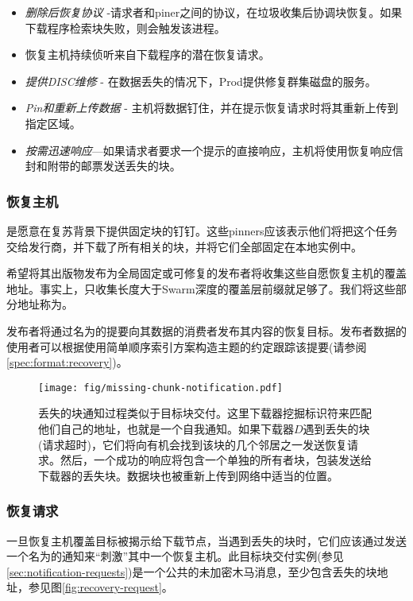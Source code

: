 \begin{itemize}
\item \emph{删除后恢复协议} -请求者和piner之间的协议，在垃圾收集后协调块恢复。如果下载程序检索块失败，则会触发该进程。
\item 恢复主机持续侦听来自下载程序的潜在恢复请求。
\item \emph{提供DISC维修} -
在数据丢失的情况下，Prod提供修复群集磁盘的服务。
\item \emph{Pin和重新上传数据} -
主机将数据钉住，并在提示恢复请求时将其重新上传到指定区域。 
\item \emph{按需迅速响应}—如果请求者要求一个提示的直接响应，主机将使用恢复响应信封和附带的邮票发送丢失的块。
\end{itemize}

\subsubsection{恢复主机}

是愿意在复苏背景下提供固定块的钉钉。这些pinners应该表示他们将把这个任务交给发行商，并下载了所有相关的块，并将它们全部固定在本地实例中。

希望将其出版物发布为全局固定或可修复的发布者将收集这些自愿恢复主机的覆盖地址。事实上，只收集长度大于Swarm深度的覆盖层前缀就足够了。我们将这些部分地址称为。

发布者将通过名为的提要向其数据的消费者发布其内容的恢复目标。发布者数据的使用者可以根据使用简单顺序索引方案构造主题的约定跟踪该提要(请参阅\ref{spec:format:recovery})。 

\begin{figure}[htbp]
\centering
\texttt{[image: fig/missing-chunk-notification.pdf]} \caption[缺少块通知进程\statusgreen]{丢失的块通知过程类似于目标块交付。这里下载器挖掘标识符来匹配他们自己的地址，也就是一个自我通知。如果下载器$D$遇到丢失的块(请求超时)，它们将向有机会找到该块的几个邻居之一发送恢复请求。然后，一个成功的响应将包含一个单独的所有者块，包装发送给下载器的丢失块。数据块也被重新上传到网络中适当的位置。}
\label{fig:missing-chunk-notification}
\end{figure}

\subsubsection{恢复请求}

一旦恢复主机覆盖目标被揭示给下载节点，当遇到丢失的块时，它们应该通过发送一个名为的通知来“刺激”其中一个恢复主机。此目标块交付实例(参见\ref{sec:notification-requests})是一个公共的未加密木马消息，至少包含丢失的块地址，参见图\ref{fig:recovery-request}。

